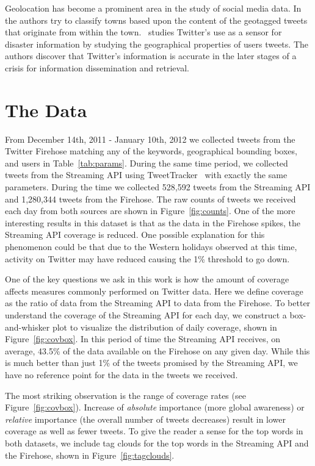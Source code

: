 \documentclass[letterpaper]{article}
\begin{document}
Geolocation has become a prominent area in the study of social media data. In~\cite{Waka11} the authors try to classify towns based upon the content of the geotagged tweets that originate from within the town.~\cite{Delo09} studies Twitter's use as a sensor for disaster information by studying the geographical properties of users tweets. The authors discover that Twitter's information is accurate in the later stages of a crisis for information dissemination and retrieval.

\section{The Data}
From December 14th, 2011 - January 10th, 2012 we collected tweets from the Twitter Firehose matching any of the keywords, geographical bounding boxes, and users in Table~\ref{tab:params}. During the same time period, we collected tweets from the Streaming API using TweetTracker~\cite{Kumar2011} with exactly the same parameters. During the time we collected 528,592 tweets from the Streaming API and 1,280,344 tweets from the Firehose. The raw counts of tweets we received each day from both sources are shown in Figure~\ref{fig:counts}. One of the more interesting results in this dataset is that as the data in the Firehose spikes, the Streaming API coverage is reduced. One possible explanation for this phenomenon could be that due to the Western holidays observed at this time, activity on Twitter may have reduced causing the 1\% threshold to go down.

One of the key questions we ask in this work is how the amount of coverage affects measures commonly performed on Twitter data. Here we define coverage as the ratio of data from the Streaming API to data from the Firehose. To better understand the coverage of the Streaming API for each day, we construct a box-and-whisker plot to visualize the distribution of daily coverage, shown in Figure~\ref{fig:covbox}. In this period of time the Streaming API receives, on average, 43.5\% of the data available on the Firehose on any given day. While this is much better than just 1\% of the tweets promised by the Streaming API, we have no reference point for the data in the tweets we received.

The most striking observation is the range of coverage rates (see Figure~\ref{fig:covbox}). Increase of \emph{absolute} importance (more global awareness) or \emph{relative} importance (the overall number of tweets decreases) result in lower coverage as well as fewer tweets. To give the reader a sense for the top words in both datasets, we include tag clouds for the top words in the Streaming API and the Firehose, shown in Figure~\ref{fig:tagclouds}.
\end{document}
